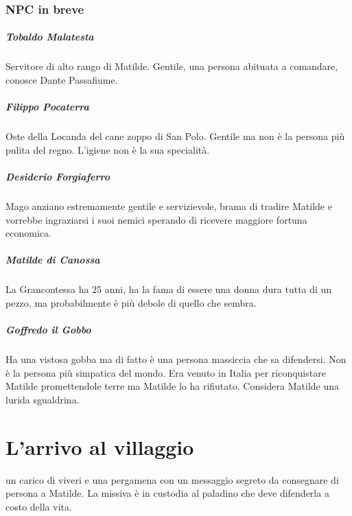 \documentclass[letterpaper,twocolumn,openany,nodeprecatedcode]{dndbook}
\begin{document}
\subsection{NPC in breve}

\paragraph{Tobaldo Malatesta} Servitore di alto rango di Matilde. Gentile, una persona abituata a comandare, conosce Dante Passafiume.

\paragraph{Filippo Pocaterra} Oste della Locanda del cane zoppo di San Polo. Gentile ma non è la persona più pulita del regno. L'igiene non è la sua specialità.

\paragraph{Desiderio Forgiaferro} Mago anziano estremamente gentile e servizievole, brama di tradire Matilde e vorrebbe ingraziarsi i suoi nemici sperando di ricevere maggiore fortuna economica.

\paragraph{Matilde di Canossa} La Grancontessa ha 25 anni, ha la fama di essere una donna dura tutta di un pezzo, ma probabilmente è più debole di quello che sembra.

\paragraph{Goffredo il Gobbo} Ha una vistosa gobba ma di fatto è una persona massiccia che sa difendersi. Non è la persona più simpatica del mondo. Era venuto in Italia per riconquistare Matilde promettendole terre ma Matilde lo ha rifiutato. Considera Matilde una lurida sgualdrina.


\chapter{L'arrivo al villaggio}
 un carico di viveri e una pergamena con un messaggio segreto da consegnare di persona a Matilde. La miss\cite{wiki:matilde}iva è in custodia al paladino che deve difenderla a costo della vita.
\end{document}
